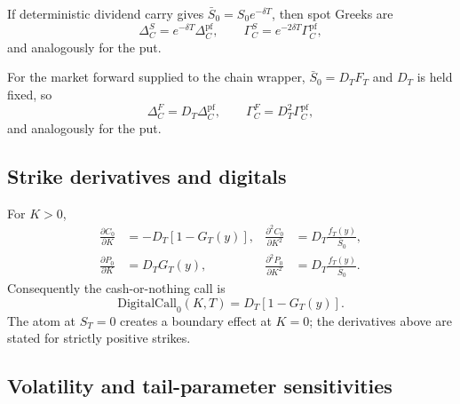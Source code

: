 \documentclass[11pt,a4paper]{article}
\newcommand{\cdf}{G}
\begin{document}
If deterministic dividend carry gives
$\bar S_0=S_0e^{-\delta T}$, then spot Greeks are
\begin{equation}
  \Delta_C^{S}=e^{-\delta T}\Delta_C^{\mathrm{pf}},\qquad
  \Gamma_C^{S}=e^{-2\delta T}\Gamma_C^{\mathrm{pf}},
  \label{eq:spot_greeks}
\end{equation}
and analogously for the put.

For the market forward supplied to the chain wrapper, $\bar S_0=D_TF_T$ and
$D_T$ is held fixed, so
\begin{equation}
  \Delta_C^{F}=D_T\Delta_C^{\mathrm{pf}},\qquad
  \Gamma_C^{F}=D_T^2\Gamma_C^{\mathrm{pf}},
  \label{eq:forward_greeks}
\end{equation}
and analogously for the put.

\subsection{Strike derivatives and digitals}

For $K>0$,
\begin{align}
  \frac{\partial C_0}{\partial K}
  &=-D_T[1-\cdf_T(y)],
  &
  \frac{\partial^2 C_0}{\partial K^2}
  &=D_T\frac{f_T(y)}{\bar S_0},
  \label{eq:call_strike_derivatives}\\
  \frac{\partial P_0}{\partial K}
  &=D_T\cdf_T(y),
  &
  \frac{\partial^2 P_0}{\partial K^2}
  &=D_T\frac{f_T(y)}{\bar S_0}.
  \label{eq:put_strike_derivatives}
\end{align}
Consequently the cash-or-nothing call is
\begin{equation}
  \mathrm{DigitalCall}_0(K,T)=D_T[1-\cdf_T(y)].
\end{equation}
The atom at $S_T=0$ creates a boundary effect at $K=0$; the derivatives above
are stated for strictly positive strikes.

\subsection{Volatility and tail-parameter sensitivities}
\end{document}
